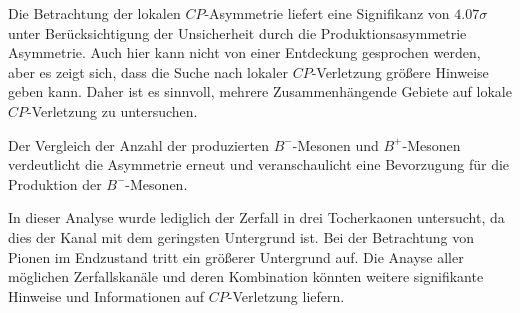 Die Betrachtung der lokalen $CP$-Asymmetrie liefert eine Signifikanz 
von $4.07\sigma$ unter Berücksichtigung der Unsicherheit durch die 
Produktionsasymmetrie Asymmetrie. Auch hier kann nicht von einer Entdeckung 
gesprochen werden, aber es zeigt sich, dass die Suche nach lokaler $CP$-Verletzung 
größere Hinweise geben kann. Daher ist es sinnvoll, mehrere Zusammenhängende 
Gebiete auf lokale $CP$-Verletzung zu untersuchen. \par 

Der Vergleich der Anzahl der produzierten $B^-$-Mesonen und $B^+$-Mesonen 
verdeutlicht die Asymmetrie erneut und veranschaulicht eine Bevorzugung für die 
Produktion der $B^-$-Mesonen. \par 

In dieser Analyse wurde lediglich der Zerfall in drei Tocherkaonen untersucht, da 
dies der Kanal mit dem geringsten Untergrund ist. Bei der Betrachtung von Pionen 
im Endzustand tritt ein größerer Untergrund auf. Die Anayse aller möglichen 
Zerfallskanäle und deren Kombination könnten weitere signifikante Hinweise und 
Informationen auf $CP$-Verletzung liefern.